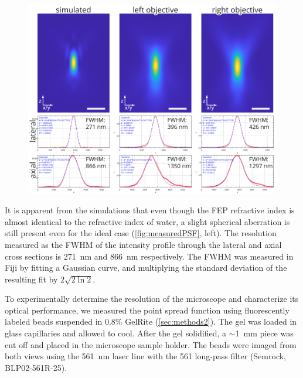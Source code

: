     \begin{figure}
      \centering
      \includegraphics[width=\textwidth]{PSF}
      \label{fig:measuredPSF}
    \end{figure}

    It is apparent from the simulations that even though the FEP refractive index is almost identical to the refractive index of water, a slight spherical aberration is still present even for the ideal case (\autoref{fig:measuredPSF}, left). The resolution measured as the FWHM of the intensity profile through the lateral and axial cross sections is \SI{271}{nm} and \SI{866}{nm} respectively. The FWHM was measured in Fiji by fitting a Gaussian curve, and multiplying the standard deviation of the resulting fit by $2 \sqrt{2 \ln 2}$.

    To experimentally determine the resolution of the microscope and characterize its optical performance, we measured the point spread function using fluorescently labeled beads suspended in 0.8\% GelRite (\autoref{sec:methods2}). The gel was loaded in glass capillaries  and allowed to cool. After the gel solidified, a $\sim$\SI{1}{mm} piece was cut off and placed in the microscope sample holder. The beads were imaged from both views using the \SI{561}{nm} laser line with the 561 long-pass filter (Semrock, BLP02-561R-25).

